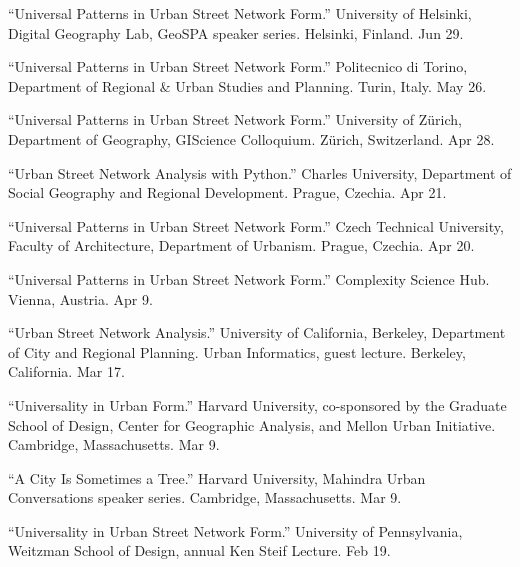 \documentclass[11pt,letterpaper]{report} %
\begin{document}
\begin{tablist}

\item[2026] \tab{}\enquote{Universal Patterns in Urban Street Network Form.} University of Helsinki, Digital Geography Lab, GeoSPA speaker series. Helsinki, Finland. Jun 29.

\item[2026] \tab{}\enquote{Universal Patterns in Urban Street Network Form.} Politecnico di Torino, Department of Regional \& Urban Studies and Planning. Turin, Italy. May 26.

\item[2026] \tab{}\enquote{Universal Patterns in Urban Street Network Form.} University of Zürich, Department of Geography, GIScience Colloquium. Zürich, Switzerland. Apr 28.

\item[2026] \tab{}\enquote{Urban Street Network Analysis with Python.} Charles University, Department of Social Geography and Regional Development. Prague, Czechia. Apr 21.

\item[2026] \tab{}\enquote{Universal Patterns in Urban Street Network Form.} Czech Technical University, Faculty of Architecture, Department of Urbanism. Prague, Czechia. Apr 20.

\item[2026] \tab{}\enquote{Universal Patterns in Urban Street Network Form.} Complexity Science Hub. Vienna, Austria. Apr 9.

\item[2026] \tab{}\enquote{Urban Street Network Analysis.} University of California, Berkeley, Department of City and Regional Planning. Urban Informatics, guest lecture. Berkeley, California. Mar 17.

\item[2026] \tab{}\enquote{Universality in Urban Form.} Harvard University, co-sponsored by the Graduate School of Design, Center for Geographic Analysis, and Mellon Urban Initiative. Cambridge, Massachusetts. Mar 9.

\item[2026] \tab{}\enquote{A City Is Sometimes a Tree.} Harvard University, Mahindra Urban Conversations speaker series. Cambridge, Massachusetts. Mar 9.

\item[2026] \tab{}\enquote{Universality in Urban Street Network Form.} University of Pennsylvania, Weitzman School of Design, annual Ken Steif Lecture. Feb 19.


\end{tablist}
\end{document}
